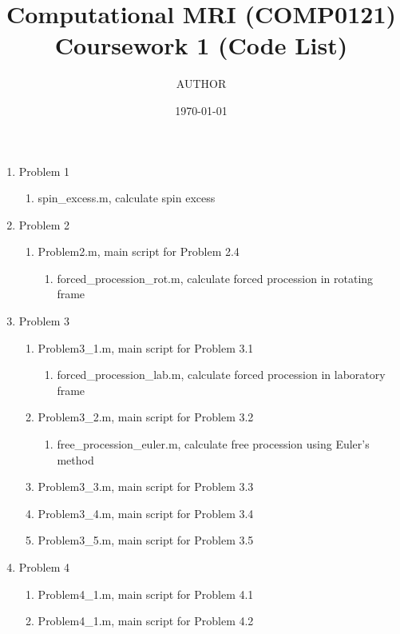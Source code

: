 \documentclass[a4paper,11pt]{article}
\begin{document}
\author{AUTHOR}
\title{Computational MRI (COMP0121) Coursework 1 (Code List)}
\date{\today}
\maketitle


\begin{enumerate}
    \item Problem 1
    \begin{enumerate}
        \item spin_excess.m, calculate spin excess
    \end{enumerate} 
    \item Problem 2
    \begin{enumerate}
      \item Problem2.m, main script for Problem 2.4
      \begin{enumerate}
          \item forced_procession_rot.m, calculate forced procession in rotating frame
      \end{enumerate}
    \end{enumerate}
    \item Problem 3
    \begin{enumerate}
        \item Problem3_1.m, main script for Problem 3.1
        \begin{enumerate}
            \item forced_procession_lab.m, calculate forced procession in laboratory frame
        \end{enumerate}
        \item Problem3_2.m, main script for Problem 3.2
        \begin{enumerate}
            \item free_procession_euler.m, calculate free procession using Euler's method
        \end{enumerate}
        \item Problem3_3.m, main script for Problem 3.3
        \item Problem3_4.m, main script for Problem 3.4
        \item Problem3_5.m, main script for Problem 3.5
    \end{enumerate}
    \item Problem 4
    \begin{enumerate}
        \item Problem4_1.m, main script for Problem 4.1
        \item Problem4_1.m, main script for Problem 4.2

\end{enumerate}
\end{enumerate}
\end{document}
